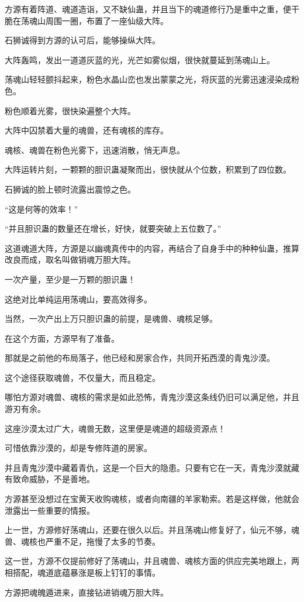 \begin{this_body}
方源有着阵道、魂道造诣，又不缺仙蛊，并且当下的魂道修行乃是重中之重，便干脆在荡魂山周围一圈，布置了一座仙级大阵。

石狮诚得到方源的认可后，能够操纵大阵。

大阵轰鸣，发出一道道灰蓝的光，光芒如雾似烟，很快就蔓延到荡魂山上。

荡魂山轻轻颤抖起来，粉色水晶山峦也发出蒙蒙之光，将灰蓝的光雾迅速浸染成粉色。

粉色顺着光雾，很快染遍整个大阵。

大阵中囚禁着大量的魂兽，还有魂核的库存。

魂核、魂兽在粉色光雾下，迅速消散，悄无声息。

大阵运转片刻，一颗颗的胆识蛊凝聚而出，很快就从个位数，积累到了四位数。

石狮诚的脸上顿时流露出震惊之色。

“这是何等的效率！”

“并且胆识蛊的数量还在增长，好快，就要突破上五位数了。”

这道魂道大阵，方源是以幽魂真传中的内容，再结合了自身手中的种种仙蛊，推算改良而成，取名叫做销魂万胆大阵。

一次产量，至少是一万颗的胆识蛊！

这绝对比单纯运用荡魂山，要高效得多。

当然，一次产出上万只胆识蛊的前提，是魂兽、魂核足够。

在这个方面，方源早有了准备。

那就是之前他的布局落子，他已经和房家合作，共同开拓西漠的青鬼沙漠。

这个途径获取魂兽，不仅量大，而且稳定。

哪怕方源对魂兽、魂核的需求是如此恐怖，青鬼沙漠这条线仍旧可以满足他，并且游刃有余。

这座沙漠太过广大，魂兽无数，这里便是魂道的超级资源点！

可惜依靠沙漠的，却是专修阵道的房家。

并且青鬼沙漠中藏着青仇，这是一个巨大的隐患。只要有它在一天，青鬼沙漠就藏有致命威胁，不是善地。

方源甚至没想过在宝黄天收购魂核，或者向南疆的羊家勒索。若是这样做，他就会泄露出一些重要的情报。

上一世，方源修好荡魂山，还要在很久以后。并且荡魂山修复好了，仙元不够，魂兽、魂核也严重不足，拖慢了太多的节奏。

这一世，方源不仅提前修好了荡魂山，并且魂兽、魂核方面的供应完美地跟上，两相搭配，魂道底蕴暴涨是板上钉钉的事情。

方源把魂魄遁进来，直接钻进销魂万胆大阵。


\end{this_body}

